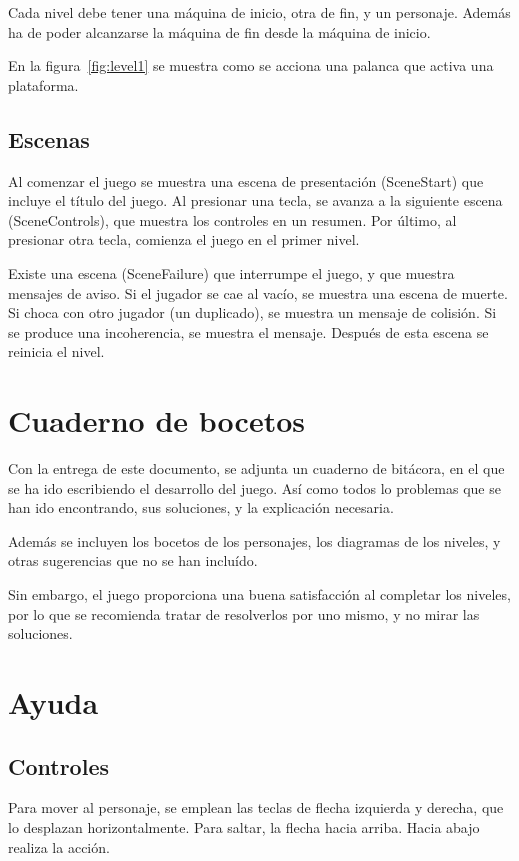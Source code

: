 \documentclass[11pt,a4paper]{article}
\begin{document}
Cada nivel debe tener una máquina de inicio, otra de fin, y un personaje.  
Además ha de poder alcanzarse la máquina de fin desde la máquina de inicio.

En la figura~\ref{fig:level1} se muestra como se acciona una palanca que activa 
una plataforma.

\subsection{Escenas}

Al comenzar el juego se muestra una escena de presentación (SceneStart) que 
incluye el título del juego. Al presionar una tecla, se avanza a la siguiente 
escena (SceneControls), que muestra los controles en un resumen. Por último, al 
presionar otra tecla, comienza el juego en el primer nivel.

Existe una escena (SceneFailure) que interrumpe el juego, y que muestra mensajes 
de aviso.  Si el jugador se cae al vacío, se muestra una escena de muerte. Si 
choca con otro jugador (un duplicado), se muestra un mensaje de colisión. Si se 
produce una incoherencia, se muestra el mensaje. Después de esta escena se 
reinicia el nivel.

\section{Cuaderno de bocetos}
Con la entrega de este documento, se adjunta un cuaderno de bitácora, en el que 
se ha ido escribiendo el desarrollo del juego. Así como todos lo problemas que 
se han ido encontrando, sus soluciones, y la explicación necesaria.

Además se incluyen los bocetos de los personajes, los diagramas de los niveles, 
y otras sugerencias que no se han incluído.

Sin embargo, el juego proporciona una buena satisfacción al completar los 
niveles, por lo que se recomienda tratar de resolverlos por uno mismo, y no 
mirar las soluciones.

\section{Ayuda}

\subsection{Controles}
Para mover al personaje, se emplean las teclas de flecha izquierda y derecha, 
que lo desplazan horizontalmente. Para saltar, la flecha hacia arriba. Hacia 
abajo realiza la acción.
\end{document}
